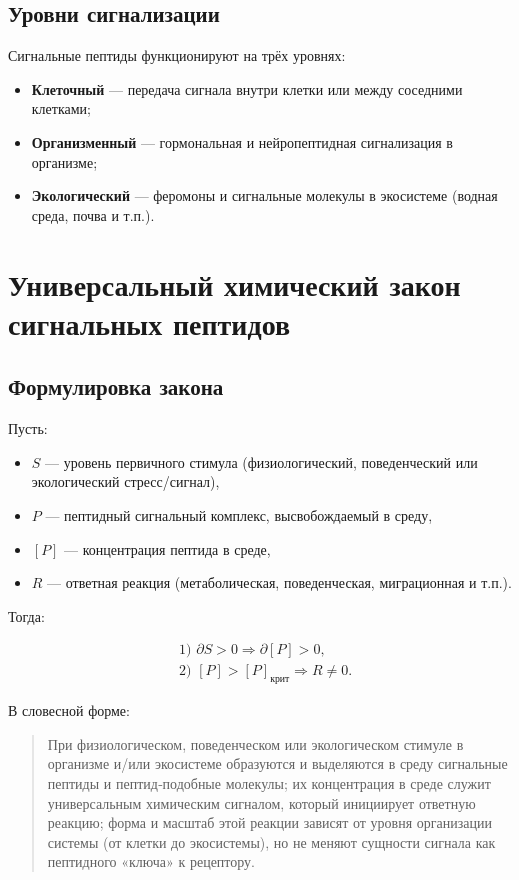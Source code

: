 \documentclass[12pt]{article}
\begin{document}
\subsection{Уровни сигнализации}

Сигнальные пептиды функционируют на трёх уровнях:
\begin{itemize}
  \item \textbf{Клеточный} — передача сигнала внутри клетки или между соседними клетками;
  \item \textbf{Организменный} — гормональная и нейропептидная сигнализация в организме;
  \item \textbf{Экологический} — феромоны и сигнальные молекулы в экосистеме (водная среда, почва и т.п.).
\end{itemize}

\section{Универсальный химический закон сигнальных пептидов}

\subsection{Формулировка закона}

Пусть:

\begin{itemize}
  \item $S$ — уровень первичного стимула (физиологический, поведенческий или экологический стресс/сигнал),
  \item $P$ — пептидный сигнальный комплекс, высвобождаемый в среду,
  \item $[P]$ — концентрация пептида в среде,
  \item $R$ — ответная реакция (метаболическая, поведенческая, миграционная и т.п.).
\end{itemize}

Тогда:

\begin{equation}
\begin{aligned}
&\text{1) } \partial S > 0 \Rightarrow \partial [P] > 0, \\
&\text{2) } [P] > [P]_{\text{крит}} \Rightarrow R \ne 0.
\end{aligned}
\end{equation}

В словесной форме:

\begin{quote}
При физиологическом, поведенческом или экологическом стимуле в организме и/или экосистеме образуются и выделяются в среду сигнальные пептиды и пептид‑подобные молекулы; их концентрация в среде служит универсальным химическим сигналом, который инициирует ответную реакцию; форма и масштаб этой реакции зависят от уровня организации системы (от клетки до экосистемы), но не меняют сущности сигнала как пептидного «ключа» к рецептору.
\end{quote}
\end{document}
